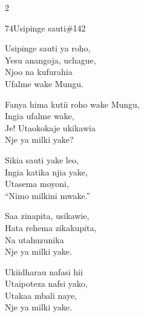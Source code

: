 \documentclass{article}
\begin{document}
\begin{multicols}{2}
\begin{hymn}{74}{Usipinge sauti}{\#142}
\begin{stanza}
Usipinge sauti ya roho,\\
Yesu anangoja, uchague,\\
Njoo na kufurahia\\
Ufalme wake Mungu.
\end{stanza}
\begin{chorus}
Fanya hima kutii roho wake Mungu,\\
Ingia ufalme wake,\\
Je! Utaokokaje ukikawia\\
Nje ya milki yake?
\end{chorus}
\begin{stanza}
Sikia sauti yake leo,\\
Ingia katika njia yake,\\
Utasema moyoni,\\
``Nimo milkini mwake.''
\end{stanza}
\begin{stanza}
Saa zinapita, usikawie,\\
Hata rehema zikakupita,\\
Na utahuzunika\\
Nje ya milki yake.
\end{stanza}
\begin{stanza}
Ukiidharau nafasi hii\\
Utaipoteza nafsi yako,\\
Utakaa mbali naye,\\
Nje ya milki yake.
\end{stanza}
\end{hymn}


\end{multicols}
\end{document}

